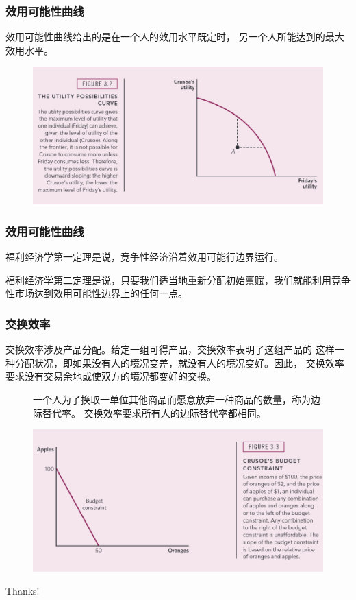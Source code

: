 \documentclass[aspectratio=169, 12pt]{beamer}
\begin{document}
\begin{frame}[plain]
    \frametitle{效用可能性曲线}
    效用可能性曲线给出的是在一个人的效用水平既定时，
    另一个人所能达到的最大效用水平。
    \begin{figure}
        \centering
        \includegraphics[width=1.0\textwidth]{./resources/figure/utilityc.png}
    \end{figure}
\end{frame}

\begin{frame}[plain]
    \frametitle{效用可能性曲线}
    福利经济学第一定理是说，竞争性经济沿着效用可能行边界运行。
    \par
    福利经济学第二定理是说，只要我们适当地重新分配初始禀赋，我们就能利用竞争性市场达到效用可能性边界上的任何一点。
\end{frame}

\begin{frame}[plain]
    \frametitle{交换效率}
    交换效率涉及产品分配。给定一组可得产品，交换效率表明了这组产品的
    这样一种分配状况，即如果没有人的境况变差，就没有人的境况变好。因此，
    交换效率要求没有交易余地或使双方的境况都变好的交换。
    \begin{figure}
        \centering
        \begin{minipage}{0.3\linewidth}
            一个人为了换取一单位其他商品而愿意放弃一种商品的数量，称为边际替代率。
            交换效率要求所有人的边际替代率都相同。
        \end{minipage}%
        \begin{minipage}{0.7\linewidth}
            \centering
            \includegraphics[width=1.0\textwidth]{./resources/figure/budget.png}
        \end{minipage}
    \end{figure}
\end{frame}

\begin{frame}[standout]
    \begin{center}
        {\Huge\calligra Thanks!}
    \end{center}
\end{frame}
\end{document}
